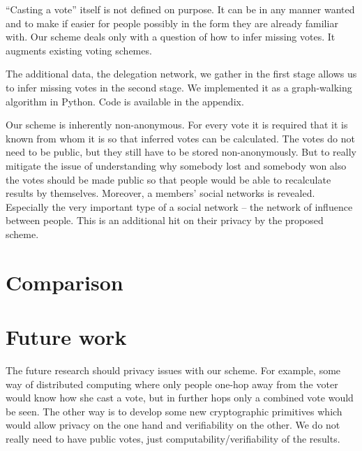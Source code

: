 \documentclass[a4paper]{acm_proc_article-sp}
\begin{document}
``Casting a vote'' itself is not defined on purpose. It can be in any manner wanted and to make if easier for people possibly
in the form they are already familiar with. Our scheme deals only with a question of how to infer missing votes. It augments
existing voting schemes.

The additional data, the delegation network, we gather in the first stage allows us to infer missing votes in the second stage.
We implemented it as a graph-walking algorithm in Python. Code is available in the appendix.






Our scheme is inherently non-anonymous. For every vote it is required that it is known from whom it is so that inferred votes can be calculated. The votes do not need to be public, but they still have to be stored non-anonymously. But to really mitigate the issue of understanding why somebody lost and somebody won also the votes should be made public so that people would be able to recalculate results by themselves. Moreover, a members' social networks is revealed. Especially the very important type of a social network -- the network of influence between people. This is an additional hit on their privacy by the proposed scheme.


\section{Comparison}


\section{Future work}

The future research should privacy issues with our scheme. For example, some way of distributed computing where only people one-hop away from the voter would know how she cast a vote, but in further hops only a combined vote would be seen. The other way is to develop some new cryptographic primitives which would allow privacy on the one hand and verifiability on the other. We do not really need to have public votes, just computability/verifiability of the results.
\end{document}
